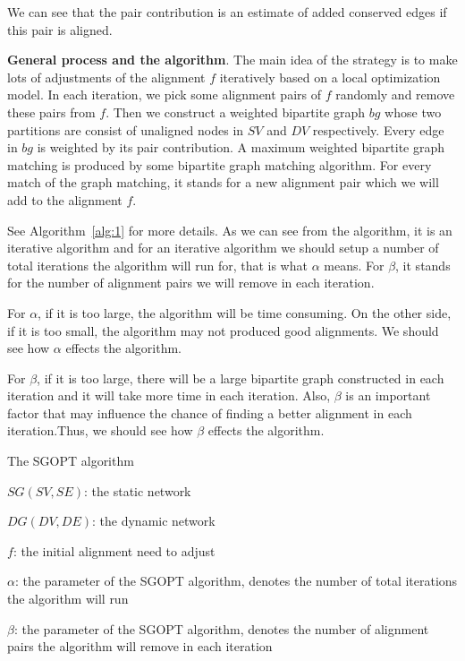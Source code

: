 \documentclass{bioinfo}
\theoremstyle{definition}
\begin{document}
\begin{methods}
We can see that the pair contribution is an estimate of added conserved edges if this pair is aligned.

\textbf{General process and the algorithm}. The main idea of the strategy is to make lots of adjustments of the alignment $f$ iteratively based on a local optimization model. In each iteration, we pick some alignment pairs of $f$ randomly and remove these pairs from $f$. Then we construct a weighted bipartite graph $bg$ whose two partitions are consist of unaligned nodes in $SV$ and $DV$ respectively. Every edge in $bg$ is weighted by its pair contribution. A maximum weighted bipartite graph matching is produced by some bipartite graph matching algorithm. For every match of the graph matching, it stands for a new alignment pair which we will add to the alignment $f$.

See Algorithm~\ref{alg:1} for more details. As we can see from the algorithm, it is an iterative algorithm and for an iterative algorithm we should setup a number of total iterations the algorithm will run for, that is what $\alpha$ means. For $\beta$, it stands for the number of alignment pairs we will remove in each iteration. 

For $\alpha$, if it is too large, the algorithm will be time consuming. On the other side, if it is too small, the algorithm may not produced good alignments. We should see how $\alpha$ effects the algorithm.

For $\beta$, if it is too large, there will be a large bipartite graph constructed in each iteration and it will take more time in each iteration. Also, $\beta$ is an important factor that may influence the chance of finding a better alignment in each iteration.Thus, we should see how $\beta$ effects the algorithm.
\begin{algorithm}[!tpb]
    {
    \caption{The SGOPT algorithm}
    \label{alg:1}
        \begin{algorithmic}[1]
        \Require
        $SG(SV,SE)$: the static network
        
        $DG(DV,DE)$: the dynamic network 
        
        $f$: the initial alignment need to adjust
        
        $\alpha$: the parameter of the SGOPT algorithm, denotes the number of total iterations the algorithm will run
        
        $\beta$: the parameter of the SGOPT algorithm, denotes the number of alignment pairs the algorithm will remove in each iteration
        

\end{algorithmic}}
\end{algorithm}
\end{methods}
\end{document}
